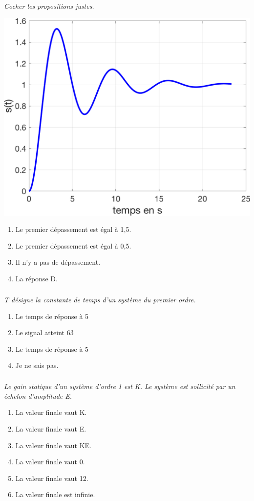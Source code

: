 \documentclass[10pt,fleqn]{article} %
\begin{document}
\begin{multicols}{2}
\subparagraph{}\textit{Cocher les propositions justes.}

\begin{center}
\includegraphics[width=.65\linewidth]{images/fig_01}
\end{center}
 
\begin{enumerate}
\item Le premier dépassement est égal à 1,5.
\item Le premier dépassement est égal à 0,5.
\item Il n'y a pas de dépassement.
\item La réponse D.
\end{enumerate}



\subparagraph{}\textit{T désigne la constante de temps d'un système du premier ordre.}
\begin{enumerate}
\item Le temps de réponse à 5%
\item Le signal atteint 63%
\item Le temps de réponse à 5%
\item Je ne sais pas.
\end{enumerate}



\subparagraph{}\textit{Le gain statique d'un système d'ordre 1 est K. Le système est sollicité par un échelon d'amplitude E.}
\begin{enumerate}
\item La valeur finale vaut K.
\item La valeur finale vaut E.
\item La valeur finale vaut KE.
\item La valeur finale vaut 0.
\item La valeur finale vaut 12.
\item La valeur finale est infinie.
\end{enumerate}



\end{multicols}
\end{document}
